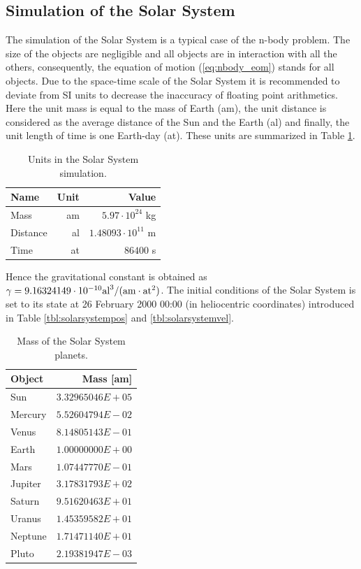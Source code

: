 \documentclass[a4paper,12pt,openany]{book}
\newcommand{\equref}[1]{(\ref{#1})}
\theoremstyle{break}
\begin{document}
\subsection{Simulation of the Solar System}
The simulation of the Solar System is a typical case of the n-body problem. The size of the objects are negligible and all objects are in interaction with all the others, consequently, the equation of motion \equref{eq:nbody_eom} stands for all objects.
Due to the space-time scale of the Solar System it is recommended to deviate from SI units to decrease the inaccuracy of floating point arithmetics. Here the unit mass is equal to the mass of Earth (am), the unit distance is considered as the average distance of the Sun and the Earth (al) and finally, the unit length of time is one Earth-day (at). These units are summarized in Table \ref{tbl:astronomical_units}.
\begin{table} [H]
\begin{center}
\caption{Units in the Solar System simulation.}\label{tbl:astronomical_units}
\begin{tabular}{ l r r }
\toprule[1.5pt]
\bf Name & \bf Unit & \bf Value \\
\midrule
Mass & am & $5.97\cdot 10^{24}$ kg \\
Distance & al & $1.48093\cdot 10^{11}$ m \\
Time & at & $86400$ s \\
\bottomrule[1.25pt]
\end{tabular}
\end{center}
\end{table}
Hence the gravitational constant is obtained as $\gamma=9.16324149\cdot 10^{-10}\rm{al}^3/(\rm{am}\cdot \rm{at}^2)$. The initial conditions of the Solar System is set to its state at 26 February 2000 00:00 (in heliocentric coordinates) introduced in Table \ref{tbl:solarsystempos} and \ref{tbl:solarsystemvel}. 
\begin{table} [H]
\begin{center}
\caption{Mass of the Solar System planets.}\label{tbl:solarsystemmass}
\begin{tabular}{ l r }
\toprule[1.5pt]
\bf Object & \bf Mass [am] \\
\midrule
Sun & $3.32965046E+05$ \\
Mercury & $5.52604794E-02$ \\
Venus & $8.14805143E-01$ \\
Earth & $1.00000000E+00$ \\
Mars & $1.07447770E-01$ \\
Jupiter & $3.17831793E+02$ \\
Saturn & $9.51620463E+01$ \\
Uranus & $1.45359582E+01$ \\
Neptune & $1.71471140E+01$ \\
Pluto & $2.19381947E-03$ \\
\bottomrule[1.25pt]
\end{tabular}
\end{center}
\end{table}
\end{document}

